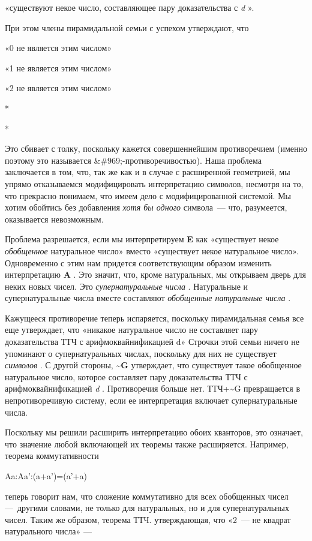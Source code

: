 \documentclass[../main.tex]{subfiles}
\begin{document}
«существуют некое число, составляющее пару доказательства с \emph{d} ».

При этом члены пирамидальной семьи с успехом утверждают, что

«0 не является этим числом»

«1 не является этим числом»

«2 не является этим числом»

*

*

Это сбивает с толку, поскольку кажется совершеннейшим противоречием (именно поэтому это называется \&\#969;-противоречивостью). Наша проблема заключается в том, что, так же как и в случае с расширенной геометрией, мы упрямо отказываемся модифицировать интерпретацию символов, несмотря на то, что прекрасно понимаем, что имеем дело с модифицированной системой. Мы хотим обойтись без добавления \emph{хотя бы одного} символа~--- что, разумеется, оказывается невозможным.

Проблема разрешается, если мы интерпретируем \textbf{E} как «существует некое \emph{обобщенное} натуральное число» вместо «существует некое натуральное число». Одновременно с этим нам придется соответствующим образом изменить интерпретацию \textbf{A} . Это значит, что, кроме натуральных, мы открываем дверь для неких новых чисел. Это \emph{супернатуральные числа} . Натуральные и супернатуральные числа вместе составляют \emph{обобщенные натуральные числа} .

Кажущееся противоречие теперь испаряется, поскольку пирамидальная семья все еще утверждает, что «никакое натуральное число не составляет пару доказательства ТТЧ с арифмоквайнификацией d» Строчки этой семьи ничего не упоминают о супернатуральных числах, поскольку для них не существует \emph{символов} . С другой стороны, \textbf{\textasciitilde G} утверждает, что существует такое обобщенное натуральное число, которое составляет пару доказательства ТТЧ с арифмоквайнификацией \emph{d} . Противоречия больше нет. ТТЧ+\textasciitilde G превращается в непротиворечивую систему, если ее интерпретация включает супернатуральные числа.

Поскольку мы решили расширить интерпретацию обоих кванторов, это означает, что значение любой включающей их теоремы также расширяется. Например, теорема коммутативности

Aa:Aa':(a+a')=(a'+a)

теперь говорит нам, что сложение коммутативно для всех обобщенных чисел ---~другими словами, не только для натуральных, но и для супернатуральных чисел. Таким же образом, теорема ТТЧ. утверждающая, что «2~--- не квадрат натурального числа» ---
\end{document}
